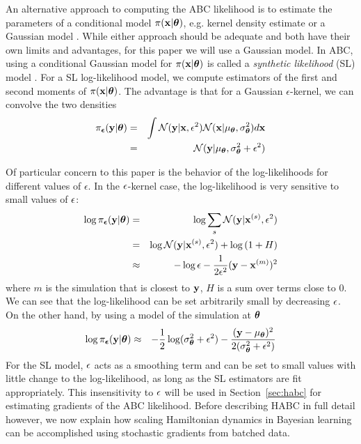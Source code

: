 \documentclass[]{article}
\begin{document}
An alternative approach to computing the ABC likelihood is to estimate the parameters of a conditional model  $\pi({\bf x}|{\bm \theta})$, e.g. kernel density estimate \cite{TurnerGenLik2014} or a Gaussian model \cite{wood2010statistical}.  While either approach should be adequate and both have their own limits and advantages, for this paper we will use a Gaussian model.  In ABC, using a conditional Gaussian model for  $\pi({\bf x}|{\bm \theta})$ is called a {\em synthetic likelihood} (SL) model \cite{wood2010statistical}.  For a SL log-likelihood model, we compute estimators of the first and second moments of $\pi({\bf x}|{\bm \theta})$.  The advantage is that for a Gaussian $\epsilon$-kernel, we can convolve the two densities   
\begin{eqnarray}
  \pi_{{\bm {\epsilon}}}( {\bf y} | {\bm \theta} ) & = & \int \mathcal{N}( {\bf y} | {\bf x}, \epsilon^2 ) \mathcal{N}( {\bf x} | 
  \mu_{{\bm \theta}}, \sigma^2_{{\bm \theta}} ) d{\bf x} \\
                          & = & \mathcal{N}( {\bf y} | \mu_{{\bm \theta}}, \sigma^2_{{\bm \theta}} + \epsilon^2 )
\end{eqnarray}

Of particular concern to this paper is the behavior of the log-likelihoods for different values of $\epsilon$.  In the $\epsilon$-kernel case, the log-likelihood is very sensitive to small values of $\epsilon$:
\begin{eqnarray}
  \log \pi_{{\bm {\epsilon}}}( {\bf y} | {\bm \theta} ) & = & \log \sum_s \mathcal{N}( {\bf y} | {\bf x}^{(s)}, \epsilon^2 ) \\
                          & = & \log \mathcal{N}( {\bf y} | {\bf x}^{(s)}, \epsilon^2 ) + \log\left( 1 + H \right) \\
                          & \approx & -\log \epsilon -\frac{1}{2 \epsilon^2} ( {\bf y} - {\bf x}^{(m)} )^2 
\end{eqnarray}
where $m$ is the simulation that is closest to ${\bf y}$, $H$ is a sum over terms close to $0$. We can see that the log-likelihood can be set arbitrarily small by decreasing $\epsilon$.  On the other hand, by using a model of the simulation at ${\bm \theta}$
\begin{eqnarray}
 \log \pi_{{\bm {\epsilon}}}( {\bf y} | {\bm \theta} ) & \approx & -\frac{1}{2} \log (\sigma^2_{{\bm \theta}} + \epsilon^2 ) -\frac{( {\bf y} - \mu_{{\bm \theta}} )^2 }{2 (\sigma^2_{{\bm \theta}} + \epsilon^2 )} 
\end{eqnarray}
 For the SL model, $\epsilon$ acts as a smoothing term and can be set to small values with little change to the log-likelihood, as long as the SL estimators are fit appropriately.  This insensitivity to $\epsilon$ will be used in Section~\ref{sec:habc} for estimating gradients of the ABC likelihood.  Before describing HABC in full detail however, we now explain how scaling Hamiltonian dynamics in Bayesian learning can be accomplished using stochastic gradients from batched data.
 
\end{document}
